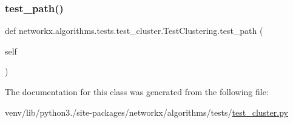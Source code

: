 \subsubsection{\texorpdfstring{test\+\_\+path()}{test\_path()}}
{\footnotesize\ttfamily def networkx.\+algorithms.\+tests.\+test\+\_\+cluster.\+Test\+Clustering.\+test\+\_\+path (\begin{DoxyParamCaption}\item[{}]{self }\end{DoxyParamCaption})}



The documentation for this class was generated from the following file\+:\begin{DoxyCompactItemize}
\item 
venv/lib/python3./site-\/packages/networkx/algorithms/tests/\hyperlink{tests_2test__cluster_8py}{test\+\_\+cluster.\+py}\end{DoxyCompactItemize}
